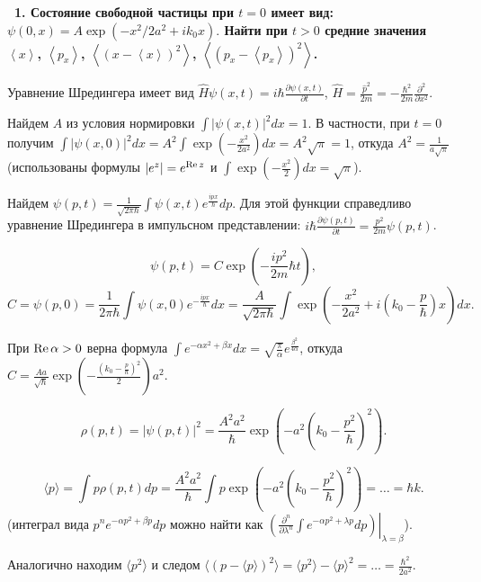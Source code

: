 \documentclass[a4paper,12pt]{article}
\begin{document}
\bigskip

\noindent\textbf{~1. Состояние свободной частицы при $t = 0$ имеет вид:
$\psi \left( {0,x} \right) = A\exp \left( { - x^2 / 2a^2 + ik_0 x}
\right).$ Найти при $t > 0$ средние значения $\left\langle x
\right\rangle$, $\left\langle {p_x } \right\rangle$, $\left\langle
{\left( {x - \left\langle x \right\rangle } \right)^2}
\right\rangle$, $\left\langle {\left( {p_x - \left\langle {p_x }
\right\rangle } \right)^2} \right\rangle $.}

Уравнение Шредингера имеет вид
$\displaystyle \hat H\psi(x,t)=i\hbar\frac{\partial\psi(x,t)}{\partial t}$,
$\displaystyle \hat H=\frac{\hat p^2}{2m}=-\frac{\hbar^2}{2m}\frac{\partial^2}
{\partial x^2}$.

Найдем $A$ из условия нормировки $\int|\psi(x,t)|^2dx=1$. В частности, при
$t=0$ получим $\int|\psi(x,0)|^2dx=A^2\int\exp\left(-\frac{x^2}{2a^2}\right)dx=
A^2\sqrt\pi=1$, откуда $\displaystyle A^2=\frac1{a\sqrt\pi}$
(использованы формулы $|e^z|=e^{\mathop{\rm Re}z}$ и
$\int\exp\left(-\frac{x^2}2\right)dx=\sqrt\pi$).

Найдем $\displaystyle\psi(p,t)=\frac1{\sqrt{2\pi\hbar}}\int\psi(x,t)
e^{\frac{ipx}\hbar}dp$. Для этой функции справедливо уравнение Шредингера
в импульсном представлении:
$\displaystyle i\hbar\frac{\partial\psi(p,t)}{\partial t}=
   \frac{p^2}{2m}\psi(p,t)$.

$$\psi(p,t)=C\exp\left(-\frac{ip^2}{2m}\hbar t\right),$$
$$C=\psi(p,0)=
  \frac1{2\pi\hbar}\int\psi(x,0)e^{-\frac{ipx}\hbar} dx=
  \frac A{\sqrt{2\pi\hbar}}\int\exp
     \left(-\frac{x^2}{2a^2}+i(k_0-\frac p\hbar)x\right)dx.$$

При $\mathop{\rm Re}\alpha>0$ верна формула
  $\displaystyle\int e^{-\alpha x^2+\beta x}dx=
   \sqrt{\frac\pi\alpha}e^{\frac{\beta^2}{4\alpha}}$, откуда
$\displaystyle C=\frac{Aa}{\sqrt\hbar}
  \exp\left(
    -\frac{\left(k_0-\frac p\hbar\right)^2}2
  \right)a^2$.

$$\rho(p,t)=|\psi(p,t)|^2=\frac{A^2a^2}\hbar\exp\left(-a^2\left(k_0-\frac{p^2}
\hbar\right)^2\right).$$

$$\langle p\rangle=\int p\rho(p,t)dp=\frac{A^2a^2}\hbar
\int p\exp\left(-a^2\left(k_0-\frac{p^2}\hbar\right)^2\right)=\ldots=\hbar k.$$
%
(интеграл вида
$\displaystyle p^ne^{-\alpha p^2+\beta p}dp$ можно найти как
$\displaystyle\left.\left(\frac{\partial^n}{\partial\lambda^n}
 \int e^{-\alpha p^2+\lambda p}dp\right)\right|_{\lambda=\beta}$).

Аналогично находим $\langle p^2\rangle$ и следом
$\langle(p-\langle p\rangle)^2\rangle=\langle p^2\rangle-\langle p\rangle^2=
\ldots=\frac{\hbar^2}{2a^2}$.
\end{document}
